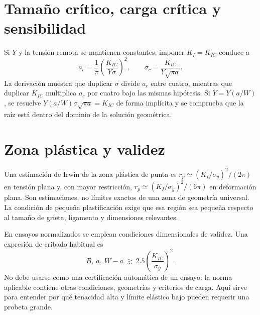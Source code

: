 \section{Tamaño crítico, carga crítica y sensibilidad}
Si $Y$ y la tensión remota se mantienen constantes, imponer $K_I=K_{IC}$ conduce a
\begin{equation}a_c=\frac{1}{\pi}\left(\frac{K_{IC}}{Y\sigma}\right)^2,\qquad\sigma_c=\frac{K_{IC}}{Y\sqrt{\pi a}}.\label{eq:ac}\end{equation}
La derivación muestra que duplicar $\sigma$ divide $a_c$ entre cuatro, mientras que duplicar $K_{IC}$ multiplica $a_c$ por cuatro bajo las mismas hipótesis. Si $Y=Y(a/W)$, se resuelve $Y(a/W)\sigma\sqrt{\pi a}=K_{IC}$ de forma implícita y se comprueba que la raíz está dentro del dominio de la solución geométrica.
\section{Zona plástica y validez}
Una estimación de Irwin de la zona plástica de punta es $r_p\simeq(K_I/\sigma_y)^2/(2\pi)$ en tensión plana y, con mayor restricción, $r_p\simeq(K_I/\sigma_y)^2/(6\pi)$ en deformación plana. Son estimaciones, no límites exactos de una zona de geometría universal. La condición de pequeña plastificación exige que esa región sea pequeña respecto al tamaño de grieta, ligamento y dimensiones relevantes.

En ensayos normalizados se emplean condiciones dimensionales de validez. Una expresión de cribado habitual es
\begin{equation}B,\ a,\ W-a\ \gtrsim\ 2.5\left(\frac{K_{IC}}{\sigma_y}\right)^2.\label{eq:espesor}\end{equation}
No debe usarse como una certificación automática de un ensayo: la norma aplicable contiene otras condiciones, geometrías y criterios de carga. Aquí sirve para entender por qué tenacidad alta y límite elástico bajo pueden requerir una probeta grande.

